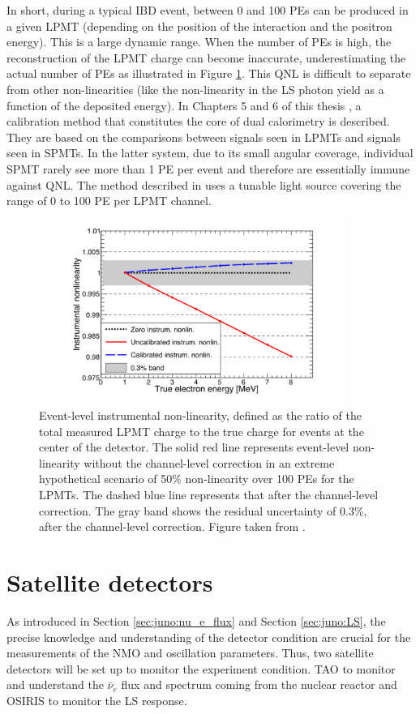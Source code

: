 \documentclass[../main.tex]{subfiles}
\begin{document}
In short, during a typical IBD event, between 0 and 100 PEs can be produced in a given LPMT (depending on the position of the interaction and the positron energy). This is a large dynamic range. When the number of PEs is high, the reconstruction of the LPMT charge can become inaccurate, underestimating the actual number of PEs as illustrated in Figure \ref{fig:juno:instr_nl}. This QNL is difficult to separate from other non-linearities (like the non-linearity in the LS photon yield as a function of the deposited energy). In Chapters 5 and 6 of this thesis \cite{han_dual_2021}, a calibration method that constitutes the core of dual calorimetry is described.  They are based on the comparisons between signals seen in LPMTs and signals seen in SPMTs. In the latter system, due to its small angular coverage, individual SPMT rarely see more than 1 PE per event and therefore are essentially immune against QNL. The method described in \cite{han_dual_2021} uses a tunable light source covering the range of 0 to 100 PE per LPMT channel.

\begin{figure}[ht]
  \centering
  \includegraphics[height=6cm]{images/juno/instr_non_linearity.png}
  \caption{Event-level instrumental non-linearity, defined as the ratio of the total measured LPMT charge to the true charge for events at the center of the detector. The solid red line represents event-level non-linearity without the channel-level correction in an extreme hypothetical scenario of 50\% non-linearity over 100 PEs for the LPMTs. The dashed blue line represents that after the channel-level correction. The gray band shows the residual uncertainty of 0.3\%, after the channel-level correction. Figure taken from \cite{juno_collaboration_calibration_2021}.}
  \label{fig:juno:instr_nl}
\end{figure}


\section{Satellite detectors}
As introduced in Section \ref{sec:juno:nu_e_flux} and Section \ref{sec:juno:LS}, the precise knowledge and understanding of the detector condition are crucial for the measurements of the NMO and oscillation parameters. Thus, two satellite detectors will be set up to monitor the experiment condition. TAO to monitor and understand the $\bar{\nu}_e$ flux and spectrum coming from the nuclear reactor and OSIRIS to monitor the LS response.
\end{document}
